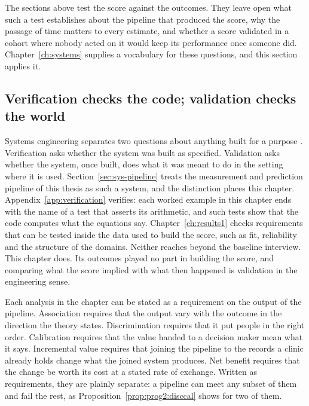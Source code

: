 \noindent The sections above test the score against the outcomes. They leave open what such a test establishes about the pipeline that produced the score, why the passage of time matters to every estimate, and whether a score validated in a cohort where nobody acted on it would keep its performance once someone did. Chapter~\ref{ch:systems} supplies a vocabulary for these questions, and this section applies it.

\subsection*{Verification checks the code; validation checks the world}

Systems engineering separates two questions about anything built for a purpose \citep{incose_2015}. Verification asks whether the system was built as specified. Validation asks whether the system, once built, does what it was meant to do in the setting where it is used. Section~\ref{sec:sys-pipeline} treats the measurement and prediction pipeline of this thesis as such a system, and the distinction places this chapter. Appendix~\ref{app:verification} verifies: each worked example in this chapter ends with the name of a test that asserts its arithmetic, and such tests show that the code computes what the equations say. Chapter~\ref{ch:results1} checks requirements that can be tested inside the data used to build the score, such as fit, reliability and the structure of the domains. Neither reaches beyond the baseline interview. This chapter does. Its outcomes played no part in building the score, and comparing what the score implied with what then happened is validation in the engineering sense.

Each analysis in the chapter can be stated as a requirement on the output of the pipeline. Association requires that the output vary with the outcome in the direction the theory states. Discrimination requires that it put people in the right order. Calibration requires that the value handed to a decision maker mean what it says. Incremental value requires that joining the pipeline to the records a clinic already holds change what the joined system produces. Net benefit requires that the change be worth its cost at a stated rate of exchange. Written as requirements, they are plainly separate: a pipeline can meet any subset of them and fail the rest, as Proposition~\ref{prop:prog2:disccal} shows for two of them.

